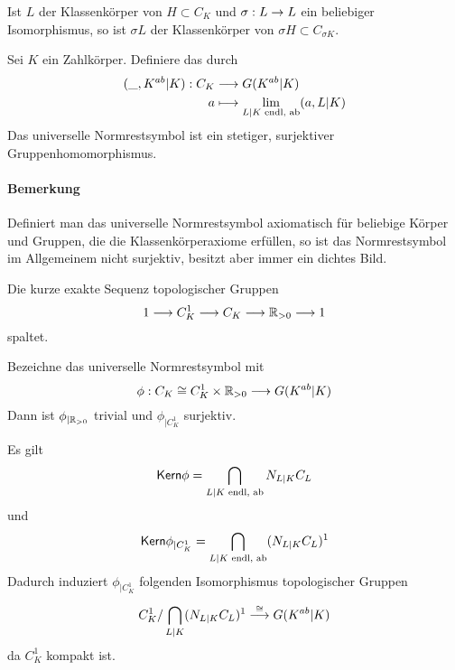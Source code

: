 \Bem{}
Ist $L$ der Klassenkörper von $H \subset C_K$ und $\sigma : L \overset{}{\rightarrow} L$ ein beliebiger Isomorphismus, so ist $\sigma L$ der Klassenkörper von $\sigma H \subset C_{\sigma K}$.

Sei $K$ ein Zahlkörper. Definiere das  durch
\begin{align*}
(\_, K^{ab} | K)  : C_K& \overset{}{\longrightarrow} G(K^{ab}|K) \\
a & \longmapsto  \lim\limits_{L|K \text{ endl, ab}}(a, L|K)
\end{align*}
Das universelle Normrestsymbol ist ein stetiger, surjektiver Gruppenhomomorphismus.
\paragraph{Bemerkung} Definiert man das universelle Normrestsymbol axiomatisch für beliebige Körper und Gruppen, die die Klassenkörperaxiome erfüllen, so ist das Normrestsymbol im Allgemeinem nicht surjektiv, besitzt aber immer ein dichtes Bild.

\Prop{}
Die kurze exakte Sequenz topologischer Gruppen
\[ 1 \overset{}{\longrightarrow} C_K^1 \overset{}{\longrightarrow} C_K \overset{}{\longrightarrow} \mathbb{R}_{> 0} \overset{}{\longrightarrow} 1 \]
spaltet.

\Lem{}
Bezeichne das universelle Normrestsymbol mit
\[ \phi : C_K \overset{}{\cong} C_K^1 \times \mathbb{R}_{>0} \overset{}{\longrightarrow} G(K^{ab}|K) \]
Dann ist $\phi_{|\mathbb{R}_{>0}}$ trivial und $\phi_{|C_K^1}$ surjektiv.

\Bem{}
Es gilt
\[ \textsf{Kern} \phi = \bigcap_{L|K \text{ endl, ab}}N_{L|K}C_L \]
und
\[ \textsf{Kern} \phi_{|C_K^1} = \bigcap_{L|K \text{ endl, ab}}(N_{L|K}C_L)^1 \]
Dadurch induziert $\phi_{|C_K^1}$ folgenden Isomorphismus topologischer Gruppen
\[ C_K^1/\bigcap_{L|K}(N_{L|K}C_L)^1 \overset{\overset{}{\cong}}{\longrightarrow} G(K^{ab}|K) \]
da $C_K^1$ kompakt ist.
